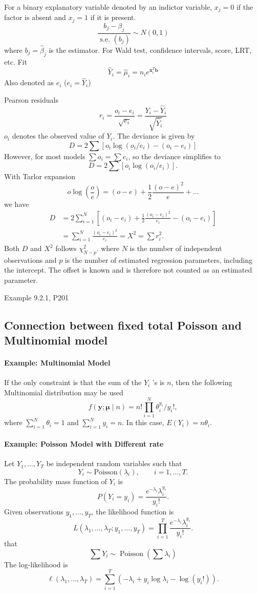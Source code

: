 \documentclass[11pt]{article}
\theoremstyle{definition}
\begin{document}
For a binary explanatory variable denoted by an indictor variable, $x_j=0$ if the factor is absent and $x_j=1$ if it is present. 
$$
\frac{b_j-\beta_j}{\text { s.e. }\left(b_j\right)} \sim N(0,1)
$$
where $b_j=\hat\beta_j$ is the estimator. For Wald test, confidence intervals, score, LRT, etc.
Fit 
$$
\widehat{Y}_i=\widehat{\mu}_i=n_i e^{\mathbf{x}_i^T \mathbf{b}}
$$
Also denoted as $e_i$ ($e_i = \hat Y_i$)

Pearson residuals
$$
r_i=\frac{o_i-e_i}{\sqrt{e_i}} = \frac{Y_i-\hat Y_i}{\sqrt{\hat Y_i}}
$$
$o_i$ denotes the observed value of $Y_i$. The deviance is given by
$$
D=2 \sum\left[o_i \log \left(o_i / e_i\right)-\left(o_i-e_i\right)\right]
$$
However, for most models $\sum o_i=\sum e_i$, so the deviance simplifies to
$$
D=2 \sum\left[o_i \log \left(o_i / e_i\right)\right] .
$$
With Tarlor expansion
$$
o \log \left(\frac{o}{e}\right)=(o-e)+\frac{1}{2} \frac{(o-e)^2}{e}+\dots
$$
we have
$$
\begin{aligned}
D & =2 \sum_{i=1}^N\left[\left(o_i-e_i\right)+\frac{1}{2} \frac{\left(o_i-e_i\right)^2}{e_i}-\left(o_i-e_i\right)\right] \\
& =\sum_{i=1}^N \frac{\left(o_i-e_i\right)^2}{e_i}=X^2=\sum r_i^2.
\end{aligned}
$$
Both $D$ and $X^2$ follows $\chi^2_{N-p}$. where \(N\) is the number of independent observations and \(p\) is the
number of estimated regression parameters, including the intercept. The
offset is known and is therefore not counted as an estimated parameter.

Example 9.2.1, P201
\subsection{Connection between fixed total Poisson and Multinomial model}

\paragraph{Example: Multinomial Model}
If the only constraint is that the sum of the $Y_i$ 's is $n$, then the following Multinomial distribution may be used
$$
f(\mathbf{y} ; \boldsymbol{\mu} \mid n)=n!\prod_{i=1}^N \theta_i^{y_i} / y_{i}!,
$$
where $\sum_{i=1}^N \theta_i=1$ and $\sum_{i=1}^N y_i=n$. In this case, $E\left(Y_i\right)=n \theta_i$.

\paragraph{Example: Poisson Model with Different rate}
Let $Y_1,\dots,Y_T$ be independent random variables such that
\[
Y_i \sim \text{Poisson}(\lambda_i), \qquad i=1,\dots,T .
\]
The probability mass function of $Y_i$ is
\[
P(Y_i=y_i)
=
\frac{e^{-\lambda_i}\lambda_i^{y_i}}{y_i!}.
\]
Given observations $y_1,\dots,y_T$, the likelihood function is
\[
L(\lambda_1,\dots,\lambda_T; y_1,\dots,y_T)
=
\prod_{i=1}^{T}
\frac{e^{-\lambda_i}\lambda_i^{y_i}}{y_i!}.
\]
that
$$
\sum Y_i \sim \operatorname{Poisson} (\sum \lambda_i)
$$
The log-likelihood is
\[
\ell(\lambda_1,\dots,\lambda_T)
=
\sum_{i=1}^{T}
\left(
-\lambda_i + y_i\log\lambda_i - \log(y_i!)
\right).
\]
\end{document}
